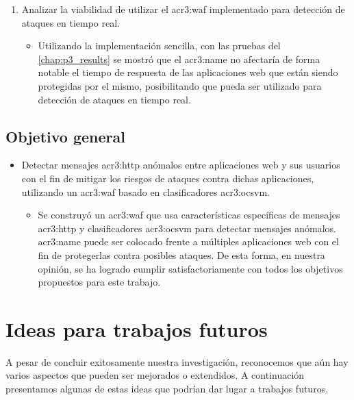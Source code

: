 \begin{enumerate}
    \item
    Analizar la viabilidad de utilizar el \gls{acr3:waf} implementado
    para detección de ataques en tiempo real.

    \begin{itemize}
        \item
        Utilizando la implementación sencilla, con las pruebas del
        \autoref{chap:p3_results} se mostró que el \gls{acr3:name} no
        afectaría de forma notable el tiempo de respuesta de las
        aplicaciones web que están siendo protegidas por el mismo,
        posibilitando que pueda ser utilizado para detección de
        ataques en tiempo real.
    \end{itemize}
\end{enumerate}


\subsection{Objetivo general}

\begin{itemize}
    \item
    Detectar mensajes \gls{acr3:http} anómalos entre aplicaciones web
    y sus usuarios con el fin de mitigar los riesgos de ataques contra
    dichas aplicaciones, utilizando un \gls{acr3:waf} basado en
    clasificadores \gls{acr3:ocsvm}.

    \begin{itemize}
        \item
        Se construyó un \gls{acr3:waf} que usa características
        específicas de mensajes \gls{acr3:http} y clasificadores
        \gls{acr3:ocsvm} para detectar mensajes anómalos.
        \gls{acr3:name} puede ser colocado frente a múltiples
        aplicaciones web con el fin de protegerlas contra posibles
        ataques.
        De esta forma, en nuestra opinión, se ha logrado cumplir
        satisfactoriamente con todos los objetivos propuestos para
        este trabajo.
    \end{itemize}
\end{itemize}


\section{Ideas para trabajos futuros}

A pesar de concluir exitosamente nuestra investigación, reconocemos que
aún hay varios aspectos que pueden ser mejorados o extendidos. A continuación
presentamos algunas de estas ideas que podrían dar lugar a trabajos futuros.

